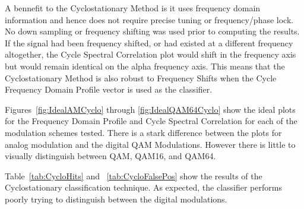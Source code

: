 A bennefit to the Cyclostationary Method is it uses frequency domain information
and hence does not require precise tuning or frequency/phase lock.  No down
sampling or frequency shifting was used prior to computing the results.  If the
signal had been frequency shifted, or had existed at a different frequency
altogether, the Cycle Spectral Correlation plot would shift in the frequency
axis but would remain identical on the alpha frequency axis.  This means that
the Cyclostationary Method is also robust to Frequency Shifts when the Cycle
Frequency Domain Profile vector is used as the classifier.

Figures~\ref{fig:IdealAMCyclo} through \ref{fig:IdealQAM64Cyclo} show the
ideal plots for the Frequency Domain Profile and Cycle Spectral Correlation for
each of the modulation schemes tested.  There is a stark difference between the
plots for analog modulation and the digital QAM Modulations.  However there is 
little to visually distinguish between QAM, QAM16, and QAM64.  

Table~\ref{tab:CycloHits} and ~\ref{tab:CycloFalsePos} show the results of the
Cyclostationary classification technique.  As expected, the classifier performs
poorly trying to distinguish between the digital modulations.

